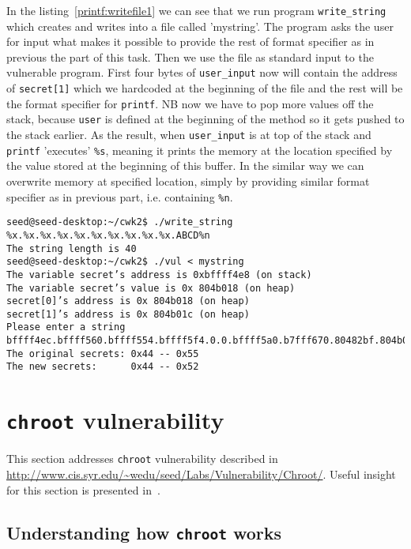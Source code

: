 \documentclass[12pt, a4paper, pdflatex]{article}
\begin{document}
In the listing~\ref{printf:writefile1} we can see that we run program \texttt{write\_string} which creates and writes into a file called 'mystring'. The program asks the user for input what makes it possible to provide the rest of format specifier as in previous the part of this task. Then we use the file as standard input to the vulnerable program. First four bytes of \texttt{user\_input} now will contain the address of \texttt{secret[1]} which we hardcoded at the beginning of the file and the rest will be the format specifier for \texttt{printf}. NB now we have to pop more values off the stack, because \texttt{user} is defined at the beginning of the method so it gets pushed to the stack earlier. As the result, when \texttt{user\_input} is at top of the stack and \texttt{printf} 'executes' \texttt{\%s}, meaning it prints the memory at the location specified by the value stored at the beginning of this buffer. In the similar way we can overwrite memory at specified location, simply by providing similar format specifier as in previous part, i.e. containing \texttt{\%n}.

\vspace{1em}
\lstset{
	captionpos=b,
	frame=single,
	language=BASH,
	caption=Example of overwriting memory with a specified value using a file as standard input,
	label=printf:writefile2,
	breaklines=true,
  float=tb
}
\begin{lstlisting}
seed@seed-desktop:~/cwk2$ ./write_string
%x.%x.%x.%x.%x.%x.%x.%x.%x.%x.ABCD%n    
The string length is 40
seed@seed-desktop:~/cwk2$ ./vul < mystring
The variable secret’s address is 0xbffff4e8 (on stack)
The variable secret’s value is 0x 804b018 (on heap)
secret[0]’s address is 0x 804b018 (on heap)
secret[1]’s address is 0x 804b01c (on heap)
Please enter a string
bffff4ec.bffff560.bffff554.bffff5f4.0.0.bffff5a0.b7fff670.80482bf.804b018.ABCD
The original secrets: 0x44 -- 0x55
The new secrets:      0x44 -- 0x52
\end{lstlisting}


\section{\texttt{chroot} vulnerability}
This section addresses \texttt{chroot} vulnerability described in \url{http://www.cis.syr.edu/~wedu/seed/Labs/Vulnerability/Chroot/}. Useful insight for this section is presented in~\cite{chroot}.

\subsection{Understanding how \texttt{chroot} works}
\end{document}
